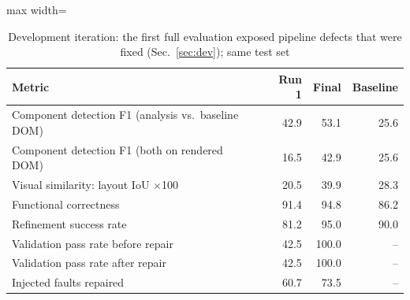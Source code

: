 \begin{table}[t]
\centering
\scriptsize
\caption{Development iteration: the first full evaluation exposed pipeline defects that were fixed (Sec.~\ref{sec:dev}); same test set}
\label{tab:dev}
\setlength{\tabcolsep}{3pt}
\begin{adjustbox}{max width=\columnwidth}
\begin{tabular}{lrrr}
\toprule
\textbf{Metric} & \textbf{Run 1} & \textbf{Final} & \textbf{Baseline} \\
\midrule
Component detection F1 (analysis vs.\ baseline DOM) & 42.9 & 53.1 & 25.6 \\
Component detection F1 (both on rendered DOM) & 16.5 & 42.9 & 25.6 \\
Visual similarity: layout IoU $\times$100 & 20.5 & 39.9 & 28.3 \\
Functional correctness & 91.4 & 94.8 & 86.2 \\
Refinement success rate & 81.2 & 95.0 & 90.0 \\
Validation pass rate before repair & 42.5 & 100.0 & -- \\
Validation pass rate after repair & 42.5 & 100.0 & -- \\
Injected faults repaired & 60.7 & 73.5 & -- \\
\bottomrule
\end{tabular}
\end{adjustbox}
\end{table}
